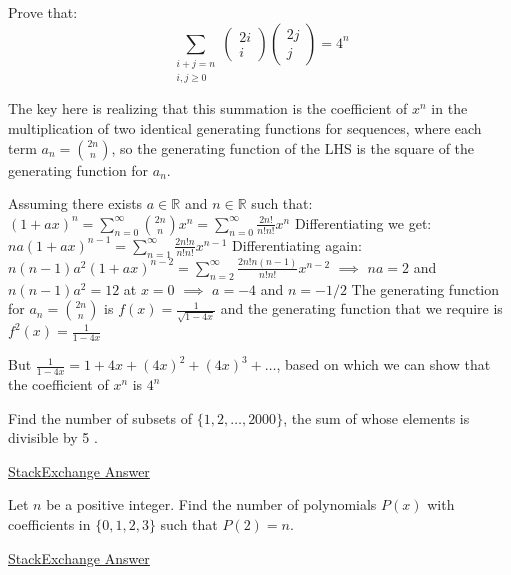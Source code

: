 \documentclass[12pt]{exam}
\begin{document}
\begin{questions}
\begin{parts}
\end{parts}

\question Prove that:
$$
\sum_{\substack{i+j=n \\
i, j \geq 0}}\left(\begin{array}{c}
2 i \\
i
\end{array}\right)\left(\begin{array}{c}
2 j \\
j
\end{array}\right)=4^{n}
$$

\begin{solution}
The key here is realizing that this summation is the coefficient of $x^n$ in the multiplication of two identical generating functions for sequences, where each term $a_n={2n \choose n}$, so the generating function of the LHS is the square of the generating function for $a_n$.

Assuming there exists $a \in \mathbb{R}$ and $n \in \mathbb{R}$ such that: \newline $\displaystyle (1+ax)^n=\sum_{n=0}^{\infty} {2n \choose n} x^n=\sum_{n=0}^{\infty} \frac{2n!}{n!n!} x^n$ \newline
Differentiating we get: $\displaystyle na(1+ax)^{n-1}=\sum_{n=1}^{\infty} \frac{2n!n}{n!n!} x^{n-1}$ \newline
Differentiating again: $\displaystyle n(n-1)a^2(1+ax)^{n-2}=\sum_{n=2}^{\infty} \frac{2n!n(n-1)}{n!n!} x^{n-2}$ \newline
$\implies$ $na=2$ and $n(n-1)a^2=12$ at $x=0$ \newline
$\implies$ $a=-4$ and $n=-1/2$ \newline
The generating function for $a_n={2n \choose n}$ is $f(x)=\frac{1}{\sqrt{1-4x}}$ and the generating function that we require is $f^{2}(x)=\frac{1}{1-4x}$

But $\frac{1}{1-4x}=1+4x+(4x)^2+(4x)^3+\dots$, based on which we can show that the coefficient of $x^n$ is $4^n$
\end{solution}

\question Find the number of subsets of $\{1,2, \ldots, 2000\}$, the sum of whose elements is divisible by 5 .
\begin{solution}
\href{https://math.stackexchange.com/questions/1618420/find-the-number-of-all-subsets-of-1-2-ldots-2015-with-n-elements-such}{StackExchange Answer}
\end{solution}

\question Let $n$ be a positive integer. Find the number of polynomials $P(x)$ with coefficients in $\{0,1,2,3\}$ such that $P(2)=n$.
\begin{solution}
\href{https://math.stackexchange.com/questions/3314422/find-the-number-of-polynomials-px-with-coefficients-0-1-2-3-such-that-p2}{StackExchange Answer}
\end{solution}


\end{questions}
\end{document}

